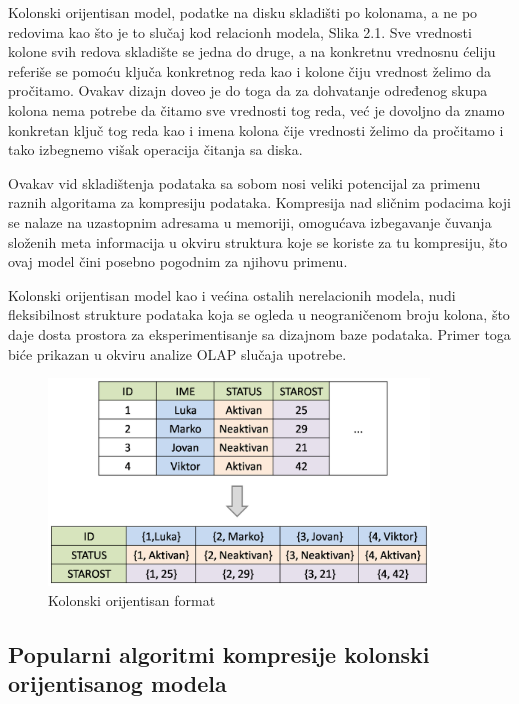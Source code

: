 \documentclass[12pt,oneside]{memoir}
\begin{document}
Kolonski orijentisan model, podatke na disku skladišti po kolonama, a ne po redovima kao što je to slučaj kod relacionh modela, Slika 2.1. Sve vrednosti kolone svih redova skladište se jedna do druge, a na konkretnu vrednosnu ćeliju referiše se pomoću ključa konkretnog reda kao i kolone čiju vrednost želimo da pročitamo. Ovakav dizajn doveo je do toga da za dohvatanje određenog skupa kolona nema potrebe da čitamo sve vrednosti tog reda, već je dovoljno da znamo konkretan ključ tog reda kao i imena kolona čije vrednosti želimo da pročitamo i tako izbegnemo višak operacija čitanja sa diska.

Ovakav vid skladištenja podataka sa sobom nosi veliki potencijal za primenu raznih algoritama za kompresiju podataka.  Kompresija nad sličnim podacima koji se nalaze na uzastopnim adresama u memoriji, omogućava izbegavanje čuvanja složenih meta informacija u okviru struktura koje se koriste za tu kompresiju, što ovaj model čini posebno pogodnim za njihovu primenu.

Kolonski orijentisan model kao i većina ostalih nerelacionih modela, nudi fleksibilnost strukture podataka koja se ogleda u neograničenom broju kolona, što daje dosta prostora za eksperimentisanje sa dizajnom baze podataka. Primer toga biće prikazan u okviru analize OLAP slučaja upotrebe. 
\begin{figure}[!ht]
  \vspace*{4cm}
  \centering
  \includegraphics[width=0.9\textwidth]{relational-column-oriented.png}
  \caption{Kolonski orijentisan format}
  \label{fig:grafikon}
\end{figure}

\subsection{Popularni algoritmi kompresije kolonski orijentisanog modela}
\end{document}

